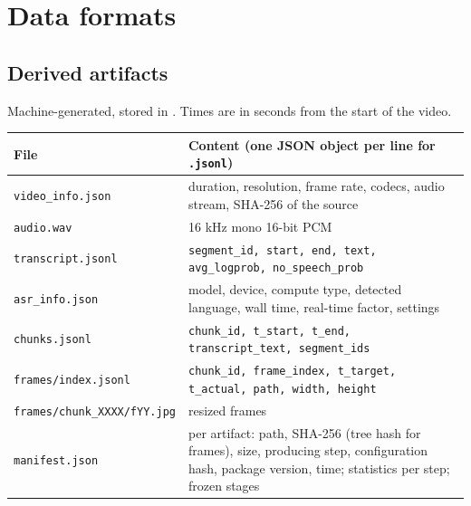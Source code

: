 \section{Data formats}\label{app:formats}

\subsection{Derived artifacts}
Machine-generated, stored in . Times are in
seconds from the start of the video.

\begin{table}[ht]
\centering\small
\begin{tabularx}{\linewidth}{@{}lX@{}}
\toprule
File & Content (one JSON object per line for \texttt{.jsonl}) \\
\midrule
\texttt{video\_info.json} & duration, resolution, frame rate, codecs, audio
  stream, SHA-256 of the source \\
\texttt{audio.wav} & 16 kHz mono 16-bit PCM \\
\texttt{transcript.jsonl} & \texttt{segment\_id, start, end, text,
  avg\_logprob, no\_speech\_prob} \\
\texttt{asr\_info.json} & model, device, compute type, detected language,
  wall time, real-time factor, settings \\
\texttt{chunks.jsonl} & \texttt{chunk\_id, t\_start, t\_end,
  transcript\_text, segment\_ids} \\
\texttt{frames/index.jsonl} & \texttt{chunk\_id, frame\_index, t\_target,
  t\_actual, path, width, height} \\
\texttt{frames/chunk\_XXXX/fYY.jpg} & resized frames \\
\texttt{manifest.json} & per artifact: path, SHA-256 (tree hash for frames),
  size, producing step, configuration hash, package version, time; statistics
  per step; frozen stages \\
\bottomrule
\end{tabularx}
\end{table}
